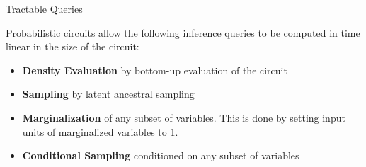         



\begin{frame}[fragile]{Tractable Queries}

    Probabilistic circuits allow the following inference queries to be computed in time linear in the size of the circuit:
    \begin{itemize}
        \item \textbf{Density Evaluation} by bottom-up evaluation of the circuit

        \item \textbf{Sampling} by latent ancestral sampling
        
        \item \textbf{Marginalization} of any subset of variables. This is done by setting input units of marginalized variables to 1.
        
        \item \textbf{Conditional Sampling} conditioned on any subset of variables
    \end{itemize}

\end{frame}



    
    
